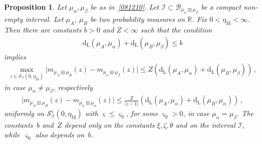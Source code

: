 \documentclass[10pt,reqno]{amsart}
\numberwithin{equation}{section}
\theoremstyle{plain}
\newtheorem{proposition}[theorem]{Proposition}
\numberwithin{kevin}{section}
\theoremstyle{remark}
\newcommand{\R}{{\mathbb R }}
\newcommand{\dL}{\mathrm{d}_{\mathrm{L}}}
\begin{document}
\begin{proposition}\label{le theorem continuity: two point mass case}
Let $\mu_\alpha,\mu_\beta$ be as in~\eqref{081210}. Let $\mathcal{I}\subset\mathcal{B}_{\mu_\alpha\boxplus\mu_\beta}$ be a compact non-empty interval.
Let $\mu_A$, $\mu_B$ be two probability measures on $\R$.  Fix $0<\eta_{\mathrm{M}}<\infty$. Then there are constants $b>0$ and $Z<\infty$ such that the condition
\begin{align}\label{new condition: two point mass}
\dL(\mu_A,\mu_\alpha)+\dL(\mu_B,\mu_\beta)\le b
\end{align}
implies
\begin{align}\label{le ksv statment: two point mass 1}
 \max_{z\in\mathcal{S}_{\mathcal{I}}(0,\eta_{\mathrm{M}})}\big|m_{\mu_A\boxplus \mu_B}(z)-m_{\mu_\alpha\boxplus\mu_\beta}(z)\big|\le Z\left(\dL(\mu_A,\mu_\alpha)+\dL(\mu_B,\mu_\beta)\right)\,,
\end{align}
in case $\mu_\alpha\neq \mu_\beta$, respectively
\begin{align}\label{le ksv statment: two point mass 2}
\big|m_{\mu_A\boxplus \mu_B}(z)-m_{\mu_\alpha\boxplus\mu_\alpha}(z)\big|\le \frac{Z}{|z-1|}\left(\dL(\mu_A,\mu_\alpha)+\dL(\mu_B,\mu_\alpha)\right)\,,
\end{align}
uniformly on $\mathcal{S}_{\mathcal{I}}^\varsigma(0,\eta_{\mathrm{M}})$ with $\varsigma\le \varsigma_0$, for some $\varsigma_0>0$, 
in case $\mu_\alpha= \mu_\beta$. The constants~$b$ and~$Z$ depend only on the constants $\xi,\zeta,\theta$ and on the interval $\mathcal{I}$, while~$\varsigma_0$ also depends on~$b$.
\end{proposition}
\end{document}
